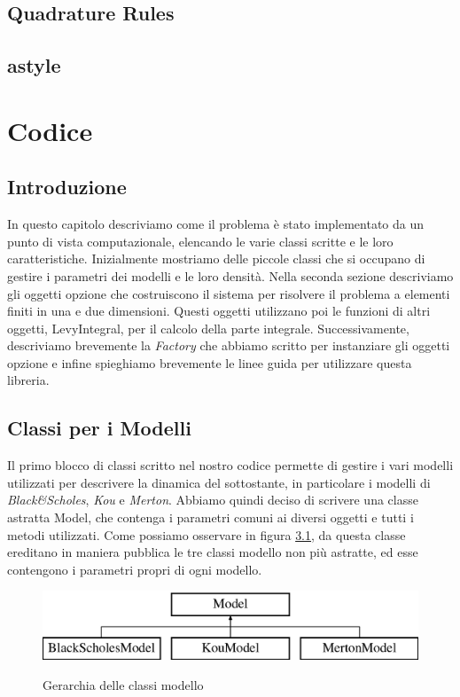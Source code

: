 \documentclass[a4paper,10pt]{report}
\theoremstyle{plain}
\theoremstyle{definition}
\theoremstyle{remark}
\begin{document}
\section{Quadrature Rules}
\section{astyle}
\chapter{Codice}
\section{Introduzione}
In questo capitolo descriviamo come il problema \`e stato implementato da un punto di vista computazionale, elencando le varie classi scritte e le loro caratteristiche. Inizialmente mostriamo delle piccole classi che si occupano di gestire i parametri dei modelli e le loro densit\`a. Nella seconda sezione descriviamo gli oggetti opzione che costruiscono il sistema per risolvere il problema a elementi finiti in una e due dimensioni. Questi oggetti utilizzano poi le funzioni di altri oggetti, \textsf{LevyIntegral}, per il calcolo della parte integrale. Successivamente, descriviamo brevemente la \emph{Factory} che abbiamo scritto per instanziare gli oggetti opzione e infine spieghiamo brevemente le linee guida per utilizzare questa libreria.
\section{Classi per i Modelli}
Il primo blocco di classi scritto nel nostro codice permette di gestire i vari modelli utilizzati per descrivere la dinamica del sottostante, in particolare i modelli di \emph{Black\&Scholes}, \emph{Kou} e \emph{Merton}. Abbiamo quindi deciso di scrivere una classe astratta \textsf{Model}, che contenga i parametri comuni ai diversi oggetti e tutti i metodi utilizzati. Come possiamo osservare in figura \ref{modelbase}, da questa classe ereditano in maniera pubblica le tre classi modello non pi\`u astratte, ed esse contengono i parametri propri di ogni modello.
\begin{figure}[h!]
\begin{center}
\includegraphics[width=12cm]{img/classModel.eps}
\label{modelbase}
\caption{Gerarchia delle classi modello}
\end{center}
\end{figure}
\end{document}
